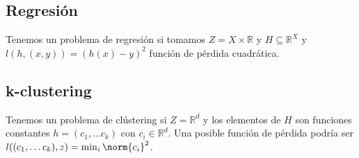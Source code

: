 \subsection{Regresión}

Tenemos un problema de regresión si tomamos $Z=X \times \mathbb{R}$ y $H\subseteq \mathbb{R}^X$
y $l(h,(x,y)) = (h(x)-y)^2$ función de pérdida cuadrática.

\subsection{k-clustering}

Tenemos un problema de clústering si $Z=\mathbb{R}^d$ y los elementos de $H$ son funciones constantes 
$h = (c_1, \ldots c_k)$ con $c_i \in \mathbb{R}^d$. Una posible función de pérdida podría ser 
$l((c_1, \ldots c_k), z) = \min_{i} \norm{c_i}^2$.
